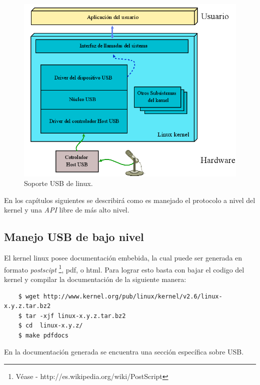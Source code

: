 \begin{figure}[htp]
\centering
\includegraphics[scale=0.5]{./img/usb_linux_layers.png}
\caption{Soporte USB de linux.}
\label{fig:usb_linux_layers}
\end{figure}


En los cap\'itulos siguientes se describir\'a como es manejado el protocolo a
nivel del kernel y una \emph{API} libre de m\'as alto nivel.


\subsection{Manejo USB de bajo nivel}

El kernel linux posee documentaci\'on embebida, la cual puede ser generada en
formato \emph{postscipt} \footnote{V\'ease -
http://es.wikipedia.org/wiki/PostScript}, pdf, o html. Para lograr esto basta
con bajar el codigo del kernel y compilar la documentaci\'on de la siguiente
manera:

\begin{scriptsize}
	\begin{verbatim}
	$ wget http://www.kernel.org/pub/linux/kernel/v2.6/linux-x.y.z.tar.bz2
	$ tar -xjf linux-x.y.z.tar.bz2
	$ cd  linux-x.y.z/
	$ make pdfdocs
	\end{verbatim}
\end{scriptsize}

En la documentaci\'on generada se encuentra una secci\'on espec\'ifica sobre
USB.\\


